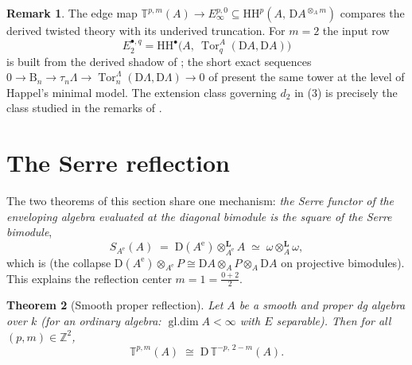 \documentclass[11pt]{amsart}
\newtheorem{theorem}{Theorem}[section]
\theoremstyle{definition}
\newtheorem{remark}[theorem]{Remark}
\newcommand{\T}{\mathbb{T}}
\newcommand{\HH}{\mathrm{HH}}
\newcommand{\D}{\mathrm{D}}
\newcommand{\Tor}{\operatorname{Tor}}
\newcommand{\gl}{\operatorname{gl.dim}}
\newcommand{\Ae}{A^{\mathrm{e}}}
\newcommand{\Lotimes}{\otimes^{\mathbf{L}}}
\newcommand{\kk}{k}
\begin{document}
\begin{remark}\label{rem:tau-edge}
The edge map
$\T^{p,m}(A)\to E_\infty^{p,0}\subseteq\HH^p(A,\,\D A^{\otimes_A m})$ compares the
derived twisted theory with its underived truncation. For $m=2$ the input row
\[
E_2^{\bullet,q}=\HH^\bullet\bigl(A,\ \Tor^A_q(\D A,\D A)\bigr)
\]
is built from the derived shadow of \cite{ArmTau}; the short exact sequences
$0\to\mathrm B_n\to\tau_n\Lambda\to\Tor_n^\Lambda(\D\Lambda,\D\Lambda)\to0$
of \cite[Theorem 3.2]{ArmTau} present the same tower at the level of
Happel's minimal model. The extension class governing $d_2$ in (3) is precisely
the class studied in the remarks of \cite[\S7.1]{ArmTau}.
\end{remark}

\section{The Serre reflection}\label{sec:refl}

The two theorems of this section share one mechanism: \emph{the Serre functor
of the enveloping algebra evaluated at the diagonal bimodule is the square of
the Serre bimodule},
\begin{equation}\label{eq:square}
S_{\Ae}(A)\;=\;\D(\Ae)\Lotimes_{\Ae}A\;\simeq\;\omega\Lotimes_A\omega,
\end{equation}
which is \cite[Theorem 3.2(4)]{ArmTau} (the collapse
$\D(\Ae)\otimes_{\Ae}P\cong\D A\otimes_AP\otimes_A\D A$ on projective
bimodules). This explains the reflection center $m=1=\tfrac{0+2}{2}$.

\begin{theorem}[Smooth proper reflection]\label{thm:reflsmooth}
Let $A$ be a smooth and proper dg algebra over $\kk$ (for an ordinary
algebra: $\gl A<\infty$ with $E$ separable). Then for all
$(p,m)\in\mathbb Z^2$,
\[
\T^{p,m}(A)\;\cong\;\D\,\T^{-p,\,2-m}(A).
\]
\end{theorem}
\end{document}
